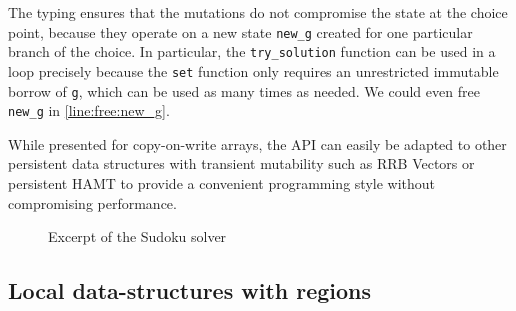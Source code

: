 The typing ensures that the mutations do not compromise the state at
the choice point, because they operate on a new state \lstinline/new_g/ created for one
particular branch of the choice.
In particular, the \lstinline/try_solution/ function can be used in a loop
precisely because the \lstinline/set/ function only requires an
unrestricted immutable borrow of \lstinline/g/, which can be used as
many times as needed.
We could even free \lstinline/new_g/ in \cref{line:free:new_g}.


While presented for copy-on-write arrays, the API
can easily be adapted to other persistent data structures with
transient mutability such as RRB Vectors \cite{DBLP:journals/pacmpl/Puente17}
or persistent HAMT \cite{bagwell2001ideal,clojurehamt} to provide  a
convenient programming style without compromising performance.

\begin{figure}
  \centering
  \begin{minipage}[t]{0.45\linewidth}
    
  \end{minipage}\hfill
  \begin{minipage}[t]{0.54\linewidth}
    
  \end{minipage}
  \caption{Excerpt of the Sudoku solver}
  \label{ex:sudoku}
\end{figure}




\subsection{Local data-structures with regions}
\label{tuto:pool}

